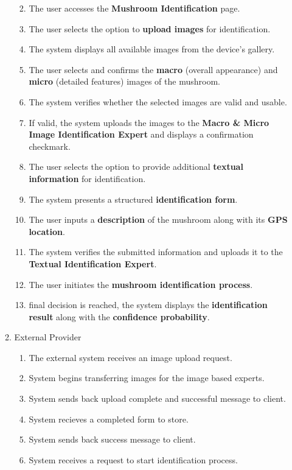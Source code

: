 \documentclass{article}
\begin{document}
\begin{enumerate}[{\bf BE1.}]
\begin{enumerate}[{\bf VP1.}]
\begin{enumerate}[1.]
					\begingroup
					\color{red}
					\item The user accesses the \textbf{Mushroom Identification} page.  
					\item The user selects the option to \textbf{upload images} for identification.  
					\item The system displays all available images from the device’s gallery.  
					\item The user selects and confirms the \textbf{macro} (overall appearance) and \textbf{micro} (detailed features) images of the mushroom.  
					\item The system verifies whether the selected images are valid and usable.  
					\item If valid, the system uploads the images to the \textbf{Macro \& Micro Image Identification Expert} and displays a confirmation checkmark.  
					\item The user selects the option to provide additional \textbf{textual information} for identification.  
					\item The system presents a structured \textbf{identification form}.  
					\item The user inputs a \textbf{description} of the mushroom along with its \textbf{GPS location}.  
					\item The system verifies the submitted information and uploads it to the \textbf{Textual Identification Expert}.  
					\item The user initiates the \textbf{mushroom identification process}.  
    				\item final decision is reached, the system displays the \textbf{identification result} along with the \textbf{confidence probability}.  
					\endgroup
				\end{enumerate}
			\item External Provider\\
				\begin{enumerate}[1.]
					\item The external system receives an image upload request.
					\item System begins transferring images for the image based experts.
					\item System sends back upload complete and successful message to client.
					\item System recieves a completed form to store.
					\item System sends back success message to client.
					\item System receives a request to start identification process.

\end{enumerate}
\end{enumerate}
\end{enumerate}
\end{document}
